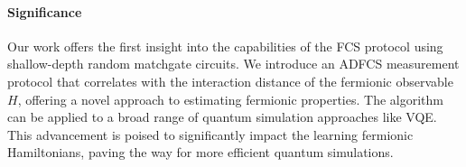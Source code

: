 \documentclass[a4paper, 12pt]{article}
\begin{document}

\begin{multicols}{2}
\paragraph{Significance}
Our work offers the first insight into the capabilities of the FCS protocol using shallow-depth random matchgate circuits. We introduce an ADFCS measurement protocol that correlates with the interaction distance of the fermionic observable $H$, offering a novel approach to estimating fermionic properties. The algorithm can be applied to a broad range of quantum simulation approaches like VQE. This advancement is poised to significantly impact the learning fermionic Hamiltonians, paving the way for more efficient quantum simulations.




\end{multicols}
\end{document}
